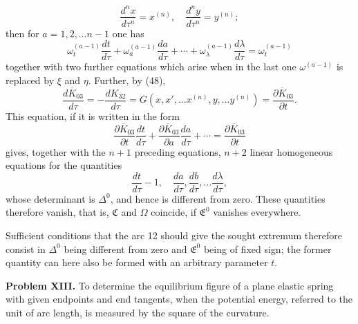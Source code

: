 \documentclass[11pt,a4paper,leqno]{article}
\begin{document}
\[
\frac{d^nx}{d\tau^n}=x^{(n)},\quad
\frac{d^ny}{d\tau^n}=y^{(n)};
\]
then for $a=1,2,\ldots n-1$ one has
\[
\omega_t^{(a-1)}\frac{dt}{d\tau}
+\omega_a^{(a-1)}\frac{da}{d\tau}
+\cdots+\omega_\lambda^{(a-1)}\frac{d\lambda}{d\tau}
=\omega_t^{(a-1)}
\]
together with two further equations which arise when in the last one $\omega^{(a-1)}$ is replaced by $\xi$ and $\eta$. Further, by (48),
\[
\frac{d\overline{K}_{03}}{d\tau}
=-\frac{dK_{32}}{d\tau}
=G(x,x',\ldots x^{(n)},y,\ldots y^{(n)})
=\frac{\partial\overline{K}_{03}}{\partial t}.
\]
This equation, if it is written in the form
\[
\frac{\partial\overline{K}_{03}}{\partial t}\frac{dt}{d\tau}
+\frac{\partial\overline{K}_{03}}{\partial a}\frac{da}{d\tau}
+\cdots
=\frac{\partial\overline{K}_{03}}{\partial t}
\]
gives, together with the $n+1$ preceding equations, $n+2$ linear homogeneous equations for the quantities
\[
\frac{dt}{d\tau}-1,\quad \frac{da}{d\tau},\frac{db}{d\tau},\ldots\frac{d\lambda}{d\tau},
\]
whose determinant is $\Delta^0$, and hence is different from zero. These quantities therefore vanish, that is, $\mathfrak{C}$ and $\Omega$ coincide, if $\mathfrak{E}^0$ vanishes everywhere.

Sufficient conditions that the arc 12 should give the sought extremum therefore consist in $\Delta^0$ being different from zero and $\mathfrak{E}^0$ being of fixed sign; the former quantity can here also be formed with an arbitrary parameter $t$.

\noindent\textbf{Problem XIII.} To determine the equilibrium figure of a plane elastic spring with given endpoints and end tangents, when the potential energy, referred to the unit of arc length, is measured by the square of the curvature.
\end{document}
